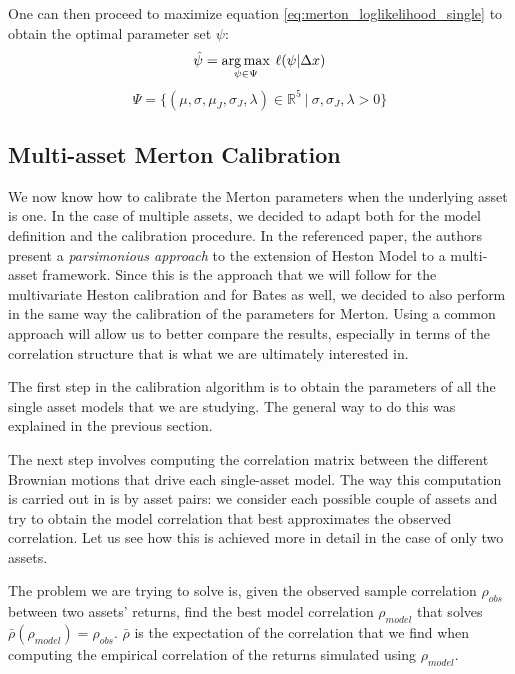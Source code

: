 One can then proceed to maximize equation \eqref{eq:merton_loglikelihood_single} to obtain the optimal parameter set $\psi$:
\begin{equation}
\hat{\psi} = \operatorname*{arg\,max}_{\psi \in \Psi} \:\ell(\psi |  \Delta x)
\end{equation}
\begin{equation}
\Psi = \{ (\mu, \sigma, \mu_J, \sigma_J, \lambda) \in \mathbb{R}^5 \: |\: \sigma,\sigma_J, \lambda >0\}
\end{equation}

\subsection{Multi-asset Merton Calibration}
\label{subsec:multi_merton_cal}

We now know  how to calibrate the Merton parameters when the underlying asset is one.
In the case of multiple assets, we decided to adapt \cite{PARSIMONIOUS2011} both for the model definition and the calibration procedure.
In the referenced paper, the authors present a \textit{parsimonious approach} to the extension of Heston Model to a multi-asset framework. Since this is the approach that we will follow for the multivariate Heston calibration and for Bates as well, we decided to also perform in the same way the calibration of the parameters for Merton.
Using a common approach will allow us to better compare the results, especially in terms of the correlation structure that is what we are ultimately interested in.

The first step in the calibration algorithm is to obtain the parameters of all the single asset models that we are studying. The general way to do this was explained in the previous section. 

The next step involves computing the correlation matrix between the different Brownian motions that drive each single-asset model. 
The way this computation is carried out in \cite{PARSIMONIOUS2011} is by asset pairs: we consider each possible couple of assets and try to obtain the model correlation that best approximates the observed correlation.
Let us see how this is achieved more in detail in the case of only two assets.

The problem we are trying to solve is, given the observed sample correlation $\rho_{obs}$ between two assets' returns, find the best model correlation $\rho_{model}$ that solves $\bar{\rho}(\rho_{model}) = \rho_{obs}$.
$\bar{\rho}$ is the expectation of the correlation that we find when computing the  empirical correlation of the returns simulated using $\rho_{model}$.

